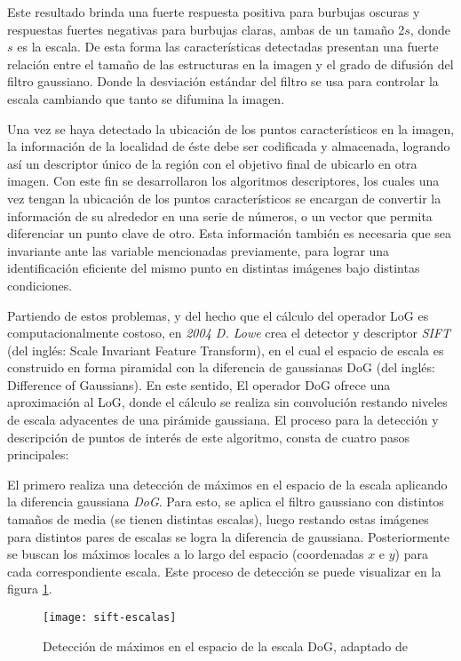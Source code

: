 Este resultado brinda una fuerte respuesta positiva para burbujas oscuras y respuestas fuertes negativas para burbujas claras, ambas de un tamaño 2$s$, donde $s$ es la escala. De esta forma las características detectadas presentan una fuerte relación entre el tamaño de las estructuras en la imagen y el grado de difusión del filtro gaussiano. Donde la desviación estándar del filtro se usa para controlar la escala cambiando que tanto se difumina la imagen.

Una vez se haya detectado la ubicación de los puntos característicos en la imagen, la información de la localidad de éste debe ser codificada y almacenada, logrando así un descriptor único de la región con el objetivo final de ubicarlo en otra imagen. Con este fin se desarrollaron los algoritmos descriptores, los cuales una vez tengan la ubicación de los puntos característicos se encargan de convertir la información de su alrededor en una serie de números, o un vector que permita diferenciar un punto clave de otro. Esta información también es necesaria que sea invariante ante las variable mencionadas previamente, para lograr una identificación eficiente del mismo punto en distintas imágenes bajo distintas condiciones.

Partiendo de estos problemas, y del hecho que el cálculo del operador LoG es computacionalmente costoso, en \textit{2004 D. Lowe} crea el detector y descriptor \textit{SIFT} \cite{sift} (del inglés: Scale Invariant Feature Transform), en el cual el espacio de escala es construido en forma piramidal con la diferencia de gaussianas DoG (del inglés: Difference of Gaussians). En este sentido, El operador DoG ofrece una aproximación al LoG, donde el cálculo se realiza sin convolución restando niveles de escala adyacentes de una pirámide gaussiana. El proceso para la detección y descripción de puntos de interés de este algoritmo, consta de cuatro pasos principales:

El primero realiza una detección de máximos en el espacio de la escala aplicando la diferencia gaussiana \textit{DoG}. Para esto, se aplica el filtro gaussiano con distintos tamaños de media (se tienen distintas escalas), luego restando estas imágenes para distintos pares de escalas se logra la diferencia de gaussiana. Posteriormente se buscan los máximos locales a lo largo del espacio (coordenadas $x$ e $y$) para cada correspondiente escala. Este proceso de detección se puede visualizar en la figura \ref{imagen:sift-escalas}.

\begin{figure}[H]
	\centering
	\texttt{[image: sift-escalas]}
	\caption[Detector SIFT]{Detección de máximos en el espacio de la escala DoG, adaptado de \cite{sift}}
	\label{imagen:sift-escalas}
\end{figure}

